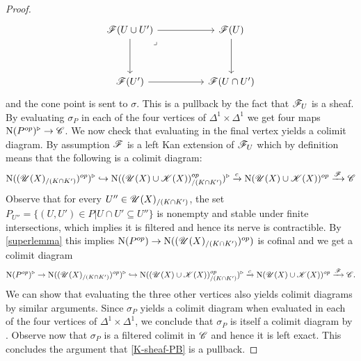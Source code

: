 \documentclass[../thesis.tex]{subfiles}
\begin{document}
\begin{proof}
    \[
        \begin{tikzcd}
            {\F(U \cup U')} && {\F(U)} \\
            \\
            {\F(U')} && {\F(U\cap U')}
            \arrow[from=1-3, to=3-3]
            \arrow[from=3-1, to=3-3]
            \arrow[from=1-1, to=3-1]
            \arrow["\lrcorner"{anchor=center, pos=0.125}, draw=none, from=1-1, to=3-3]
            \arrow[from=1-1, to=1-3]
        \end{tikzcd}
    \]
    and the cone point is sent to $\sigma$. This is a pullback by the fact that $\mathscr{F}_{U}$ is a sheaf.
    By evaluating $\sigma_P$ in each of the four vertices of $\Delta^1 \times \Delta^1$ we get four maps $\mathrm{N}(P^{op})^{\triangleright} \to \mathscr{C}$.
    We now check that evaluating in the final vertex yields a colimit diagram.
    By assumption $\mathscr{F}$ is a left Kan extension of $\mathscr{F}_{U}$ which by definition means that the following is a colimit diagram:
    \[
        \mathrm{N}((\mathscr{U}(X)_{/(K\cap K')})^{op})^{\triangleright} \hookrightarrow \mathrm{N}((\mathscr{U}(X) \cup \mathscr{K}(X))^{op}_{/(K\cap K')})^{\triangleright} \xrightarrow{c} \mathrm{N}(\mathscr{U}(X) \cup \mathscr{K}(X))^{op} \xrightarrow{\mathscr{F}}\mathscr{C}
    \]
    Observe that for every $U'' \in \mathscr{U}(X)_{/(K\cap K')}$, the set
    $P_{U''} = \{(U,U') \in P | U\cap U' \subseteq U''\}$ is nonempty and stable under finite intersections, which implies it is filtered and hence its nerve is contractible.
    By \ref{superlemma} this implies $\mathrm{N}(P^{op}) \to \mathrm{N}((\mathscr{U}(X)_{/(K\cap K')})^{op})$ is cofinal and we get a colimit diagram
    \[
        \mathrm{N}(P^{op})^{\triangleright} \to\mathrm{N}((\mathscr{U}(X)_{/(K\cap K')})^{op})^{\triangleright} \hookrightarrow \mathrm{N}((\mathscr{U}(X) \cup \mathscr{K}(X))_{/(K\cap K')}^{op})^{\triangleright} \xrightarrow{c} \mathrm{N}(\mathscr{U}(X) \cup \mathscr{K}(X))^{op} \xrightarrow{\mathscr{F}}\mathscr{C}.
    \]
    We can show that evaluating the three other vertices also yields colimit diagrams by similar arguments.
    Since $\sigma_P$ yields a colimit diagram when evaluated in each of the four vertices of $\Delta^1 \times \Delta^1$, we conclude that $\sigma_P$ is itself a colimit diagram by \cite[Proposition 5.1.2.2]{HTT}.
    Observe now that $\sigma_P$ is a filtered colimit in $\mathscr{C}$ and hence it is left exact.
    This concludes the argument that \ref{K-sheaf-PB} is a pullback.

\end{proof}
\end{document}
